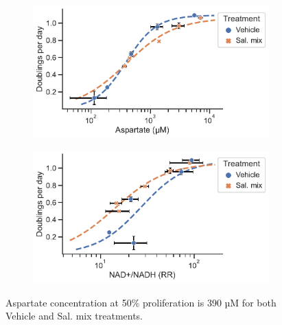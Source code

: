 \begin{figure}
     \centering
     \begin{subfigure}[b]{0.49\textwidth}
         \includegraphics[width=\textwidth]{figures/chap2/app/H1299_Met_Asp_vs_prlfr.pdf}
         \caption{}
         \label{fig:app_ch2:H1299_Met_Asp_vs_prlfr}
     \end{subfigure}
     \hfill
     \begin{subfigure}[b]{0.49\textwidth}
         \includegraphics[width=\textwidth]{figures/chap2/app/H1299_Met_NAD_vs_prlfr.pdf}
         \caption{}
         \label{fig:app_ch2:H1299_Met_NAD_vs_prlfr}
     \end{subfigure}
        \caption[hhhh]{
        Aspartate concentration at 50\% proliferation is 390 µM for both Vehicle and Sal. mix treatments.
        }
        \label{fig:app_ch2:H1299_asp_prlfr_met}
\end{figure}



